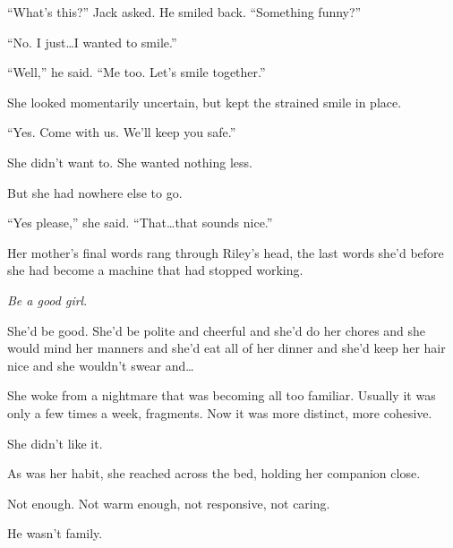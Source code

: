 ``What's this?'' Jack asked.  He smiled back.  ``Something funny?''



``No.  I just\ldots I wanted to smile.''



``Well,'' he said.  ``Me too.  Let's smile together.''



She looked momentarily uncertain, but kept the strained smile in place.



``Yes.  Come with us.  We'll keep you safe.''



She didn't want to.  She wanted nothing less.



But she had nowhere else to go.



``Yes please,'' she said.  ``That\ldots that sounds nice.''



Her mother's final words rang through Riley's head, the last words she'd before she had become a machine that had stopped working.



\emph{Be a good girl}.



She'd be good.  She'd be polite and cheerful and she'd do her chores and she would mind her manners and she'd eat all of her dinner and she'd keep her hair nice and she wouldn't swear and\ldots



\blacksquare






She woke from a nightmare that was becoming all too familiar.  Usually it was only a few times a week, fragments.  Now it was more distinct, more cohesive.



She didn't like it.



As was her habit, she reached across the bed, holding her companion close.



Not enough.  Not warm enough, not responsive, not caring.



He wasn't family.



